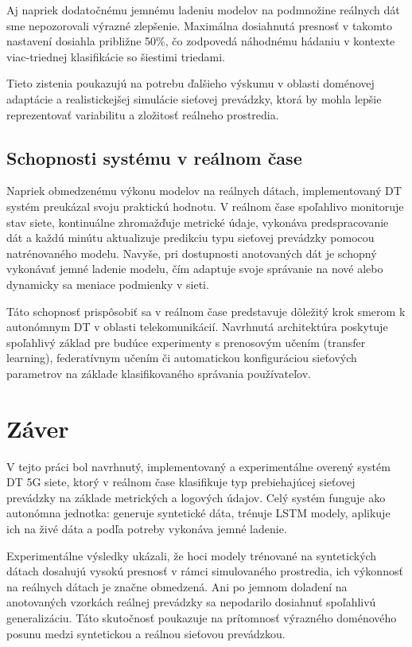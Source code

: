 \documentclass[a4paper,10pt]{ieeetran}
\begin{document}
Aj napriek dodatočnému jemnému ladeniu modelov na podmnožine reálnych dát sme nepozorovali výrazné zlepšenie. Maximálna dosiahnutá presnosť v takomto nastavení dosiahla približne 50\%, čo zodpovedá náhodnému hádaniu v kontexte viac-triednej klasifikácie so šiestimi triedami.

Tieto zistenia poukazujú na potrebu ďalšieho výskumu v oblasti doménovej adaptácie a realistickejšej simulácie sieťovej prevádzky, ktorá by mohla lepšie reprezentovať variabilitu a zložitosť reálneho prostredia.

\subsection{Schopnosti systému v reálnom čase}
\label{subsec_even}
Napriek obmedzenému výkonu modelov na reálnych dátach, implementovaný DT systém preukázal svoju praktickú hodnotu. V reálnom čase spoľahlivo monitoruje stav siete, kontinuálne zhromažďuje metrické údaje, vykonáva predspracovanie dát a každú minútu aktualizuje predikciu typu sieťovej prevádzky pomocou natrénovaného modelu. Navyše, pri dostupnosti anotovaných dát je schopný vykonávať jemné ladenie modelu, čím adaptuje svoje správanie na nové alebo dynamicky sa meniace podmienky v sieti.

Táto schopnosť prispôsobiť sa v reálnom čase predstavuje dôležitý krok smerom k autonómnym DT v oblasti telekomunikácií. Navrhnutá architektúra poskytuje spoľahlivý základ pre budúce experimenty s prenosovým učením (transfer learning), federatívnym učením či automatickou konfiguráciou sieťových parametrov na základe klasifikovaného správania používateľov.

\section{Záver}
\label{sec_conclusion}

V tejto práci bol navrhnutý, implementovaný a experimentálne overený systém DT 5G siete, ktorý v reálnom čase klasifikuje typ prebiehajúcej sieťovej prevádzky na základe metrických a logových údajov. Celý systém funguje ako autonómna jednotka: generuje syntetické dáta, trénuje LSTM modely, aplikuje ich na živé dáta a podľa potreby vykonáva jemné ladenie.

Experimentálne výsledky ukázali, že hoci modely trénované na syntetických dátach dosahujú vysokú presnosť v rámci simulovaného prostredia, ich výkonnosť na reálnych dátach je značne obmedzená. Ani po jemnom doladení na anotovaných vzorkách reálnej prevádzky sa nepodarilo dosiahnuť spoľahlivú generalizáciu. Táto skutočnosť poukazuje na prítomnosť výrazného doménového posunu medzi syntetickou a reálnou sieťovou prevádzkou.
\end{document}
